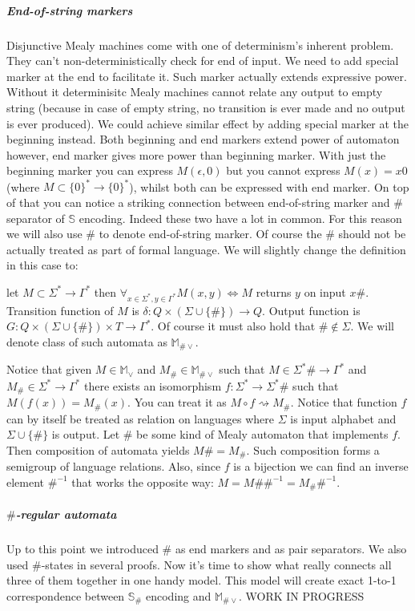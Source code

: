 \documentclass[12pt]{article}
\begin{document}
\subparagraph{End-of-string markers} Disjunctive Mealy machines come with one of determinism's inherent problem. They can't non-deterministically check for end of input. We need to add special marker at the end to facilitate it. Such marker  actually extends expressive power. Without it determinisitc Mealy machines cannot relate any output to empty string (because in case of empty string, no transition is ever made and no output is ever produced). We could achieve similar effect by adding special marker at the beginning instead. Both beginning and end markers extend power of automaton however, end  marker gives more power than beginning marker. With just the beginning marker you can express $M(\epsilon,0)$ but you cannot express $M(x) = x0$ (where $M \subset \{0\}^* \rightarrow \{0\}^*$), whilst both can be expressed with end marker. On top of that you can notice a striking connection between end-of-string marker and $\#$ separator of $\mathbb{S}$ encoding. Indeed these two have a lot in common. For this reason we will also use $\#$ to denote end-of-string marker. Of course the $\#$ should not be actually treated as part  of formal language. We will slightly change the definition in this case to:


let $M\subset \Sigma^* \rightarrow \Gamma^*$ then $\forall_{x\in \Sigma^*,y\in\Gamma^*} M(x,y) \iff M$ returns $y$ on input $x\#$. Transition function of $M$ is $\delta : Q \times (\Sigma \cup \{\#\}) \rightarrow Q$. Output function is $G : Q \times (\Sigma \cup \{\#\}) \times T \rightarrow \Gamma^*$. Of course it must also hold that $\# \notin \Sigma$. We will denote class of such automata as $\mathbb{M}_{\#\vee}$.

Notice that given $M \in \mathbb{M}_\vee$ and $M_\# \in \mathbb{M}_{\#\vee}$ such that $M \in \Sigma^*\# \rightarrow \Gamma^*$ and $M_\# \in \Sigma^* \rightarrow \Gamma^*$ there exists an isomorphism $f : \Sigma^* \rightarrow \Sigma^*\#$ such that $M(f(x)) = M_\#(x)$. You can treat it as $M \circ f \rightsquigarrow M_\#$. Notice that function $f$ can by itself be treated as relation on languages where $\Sigma$ is input alphabet and $\Sigma\cup\{\#\}$ is output. Let $\#$ be some kind of Mealy automaton that implements $f$. Then composition of automata yields $M\# = M_\#$. Such composition forms a semigroup of language relations. Also, since $f$ is a bijection we can find an inverse element $\#^{-1}$ that works the opposite way:  $M = M\#\#^{-1} = M_\#\#^{-1}$.


\subparagraph{$\#$-regular automata}Up to this point we introduced $\#$ as end markers and as pair separators. We also used $\#$-states in several proofs. Now it's time to show what really connects all three of them together in one handy model. This model will create exact 1-to-1 correspondence between $\mathbb{S}_\#$ encoding and $\mathbb{M}_{\#\vee}$. WORK IN PROGRESS
\end{document}
